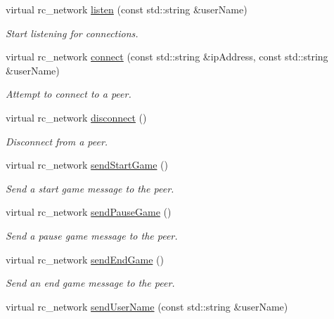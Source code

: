 \begin{DoxyCompactItemize}
\item 
virtual rc\_\-network \hyperlink{classNetworkReplayer_a54f644fe92941370481c45989bad6615}{listen} (const std::string \&userName)
\begin{DoxyCompactList}\small\item\em Start listening for connections. \item\end{DoxyCompactList}\item 
virtual rc\_\-network \hyperlink{classNetworkReplayer_a6d4deeeede0cd5c07b44489a33c113f5}{connect} (const std::string \&ipAddress, const std::string \&userName)
\begin{DoxyCompactList}\small\item\em Attempt to connect to a peer. \item\end{DoxyCompactList}\item 
virtual rc\_\-network \hyperlink{classNetworkReplayer_a3aab774a33a87446aa874871fea54655}{disconnect} ()
\begin{DoxyCompactList}\small\item\em Disconnect from a peer. \item\end{DoxyCompactList}\item 
virtual rc\_\-network \hyperlink{classNetworkReplayer_aa9f70d4eee3d630c36c2bbc71bb7e195}{sendStartGame} ()
\begin{DoxyCompactList}\small\item\em Send a start game message to the peer. \item\end{DoxyCompactList}\item 
virtual rc\_\-network \hyperlink{classNetworkReplayer_aa54ba87a728ebdb0f23a82e409094468}{sendPauseGame} ()
\begin{DoxyCompactList}\small\item\em Send a pause game message to the peer. \item\end{DoxyCompactList}\item 
virtual rc\_\-network \hyperlink{classNetworkReplayer_a33c840b356485101092fe220d4aa73fb}{sendEndGame} ()
\begin{DoxyCompactList}\small\item\em Send an end game message to the peer. \item\end{DoxyCompactList}\item 
virtual rc\_\-network \hyperlink{classNetworkReplayer_a49bb75f65853c34c0bdafa6aba066056}{sendUserName} (const std::string \&userName)

\end{DoxyCompactItemize}
